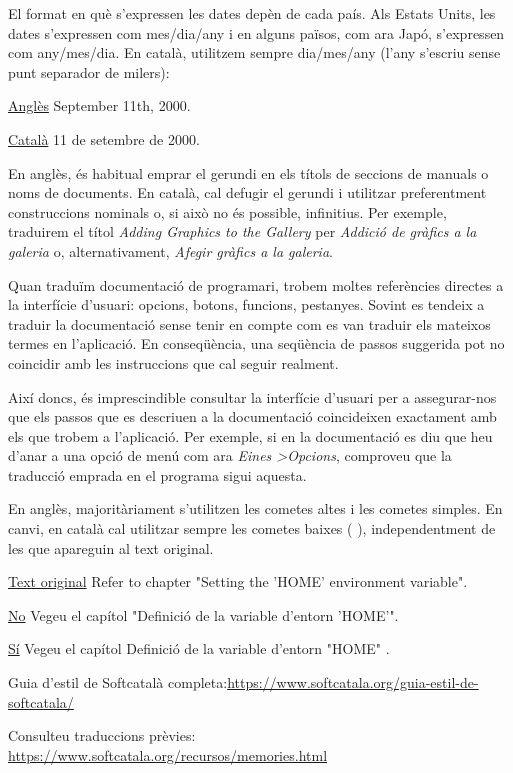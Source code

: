 \documentclass[9pt]{cheatsheet}
\begin{document}
\begin{multicols*}{3}
El format en què s'expressen les dates depèn de cada país. Als Estats Units, les dates s'expressen com mes/dia/any i en alguns països, com ara Japó, s'expressen com any/mes/dia. En català, utilitzem sempre dia/mes/any (l'any s'escriu sense punt separador de milers):

\underline {Anglès} September 11th, 2000.

\underline {Català}	11 de setembre de 2000.



En anglès, és habitual emprar el gerundi en els títols de seccions de manuals o noms de documents. En català, cal defugir el gerundi i utilitzar preferentment construccions nominals o, si això no és possible, infinitius. Per exemple, traduirem el títol \emph{Adding Graphics to the Gallery} per \emph{Addició de gràfics a la galeria} o, alternativament, \emph{Afegir gràfics a la galeria}.


Quan traduïm documentació de programari, trobem moltes referències directes a la interfície d'usuari: opcions, botons, funcions, pestanyes. Sovint es tendeix a traduir la documentació sense tenir en compte com es van traduir els mateixos termes en l'aplicació. En conseqüència, una seqüència de passos suggerida pot no coincidir amb les instruccions que cal seguir realment. 

Així doncs, és imprescindible consultar la interfície d'usuari per a assegurar-nos que els passos que es descriuen a la documentació coincideixen exactament amb els que trobem a l'aplicació. Per exemple, si en la documentació es diu que heu d'anar a una opció de menú com ara \emph{Eines \textgreater Opcions}, comproveu que la traducció emprada en el programa sigui aquesta.



En anglès, majoritàriament s’utilitzen les cometes altes i les cometes simples. En canvi, en català cal utilitzar sempre les cometes baixes ( \guillemotleft\guillemotleft \guillemotright), independentment de les que apareguin al text original.

\underline {Text original} Refer to chapter "Setting the 'HOME' environment variable".

\underline {No} Vegeu el capítol "Definició de la variable d'entorn 'HOME'".

\underline {Sí} Vegeu el capítol \guillemotleft Definició de la variable d'entorn "HOME" \guillemotright.


Guia d'estil de Softcatalà completa:\url{https://www.softcatala.org/guia-estil-de-softcatala/}

Consulteu traduccions prèvies: \url{https://www.softcatala.org/recursos/memories.html}

\end{multicols*}
\end{document}
